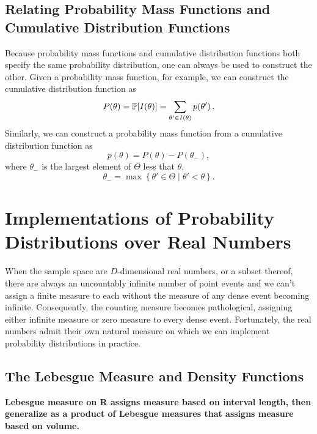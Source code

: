 \subsection{Relating Probability Mass Functions and Cumulative 
Distribution Functions}

Because probability mass functions and cumulative distribution functions 
both specify the same probability distribution, one can always be used to 
construct the other.  Given a probability mass function, for example, we 
can construct the cumulative distribution function as
%
\begin{equation*}
P \! \left( \theta \right)
= \mathbb{P} \! \left[ I \! \left( \theta \right) \right]
= \sum_{\theta' \in I ( \theta )} p \! \left( \theta' \right).
\end{equation*}
%
Similarly, we can construct a probability mass function from a cumulative
distribution function as
%
\begin{equation*}
p \! \left( \theta \right) = 
P \! \left( \theta \right)
- P \! \left( \theta_{-} \right),
\end{equation*}
%
where $\theta_{-}$ is the largest element of $\Theta$ less that $\theta$,
%
\begin{equation*}
\theta_{-} = \max \left\{ \theta' \in \Theta \mid \theta' < \theta \right\}.
\end{equation*}

\section{Implementations of Probability Distributions over Real
Numbers}

When the sample space are $D$-dimensional real numbers, or
a subset thereof, there are always an uncountably infinite number 
of point events and we can't assign a finite measure to each without
the measure of any dense event becoming infinite.  Consequently,
the counting measure becomes pathological, assigning either infinite 
measure or zero measure to every dense event.  Fortunately, the real 
numbers admit their own natural measure on which we can implement 
probability distributions in practice.

\subsection{The Lebesgue Measure and Density Functions}

\textbf{Lebesgue measure on R assigns measure based on interval
length, then generalize as a product of Lebesgue measures that
assigns measure based on volume.}


